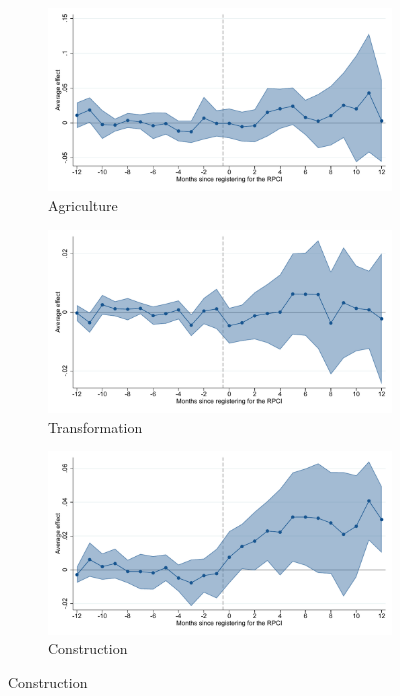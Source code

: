 \begin{figure}[H]
    \begin{subfigure}{0.32\textwidth}
    \caption{Agriculture}
    \includegraphics[width=\textwidth]{04_Figures/muestra_10porciento/event_study_log_sal_cierre_ind_agricul_dcdh_connected.pdf}
    \end{subfigure}
    \begin{subfigure}{0.32\textwidth}
    \caption{Transformation}
    \includegraphics[width=\textwidth]{04_Figures/muestra_10porciento/event_study_log_sal_cierre_ind_transf_dcdh_connected.pdf}
    \end{subfigure}
    \begin{subfigure}{0.32\textwidth}
    \caption{Construction}
    \includegraphics[width=\textwidth]{04_Figures/muestra_10porciento/event_study_log_sal_cierre_ind_constr_dcdh_connected.pdf}
    \end{subfigure}


\end{figure}
